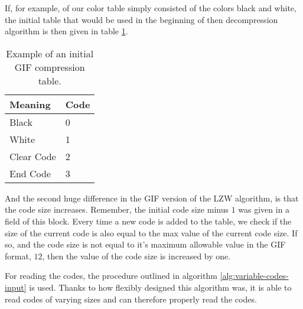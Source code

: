 If, for example, of our color table simply consisted of the colors
black and white, the initial table that would be used in the beginning
of then decompression algorithm is then given in table
\ref{tab:example-gif-color-table}.

\begin{table}
  \centering
  \begin{tabular}{ll}
    \toprule
    Meaning & Code \\
    \midrule
    Black & 0 \\
    White & 1 \\
    Clear Code & 2 \\
    End Code & 3 \\
    \bottomrule
  \end{tabular}
  \caption{Example of an initial GIF compression table.}
  \label{tab:example-gif-color-table}
\end{table}

And the second huge difference in the GIF version of the LZW
algorithm, is that the code size increases. Remember, the initial code
size minus $1$ was given in a field of this block. Every time a new
code is added to the table, we check if the size of the current code
is also equal to the max value of the current code size. If so, and
the code size is not equal to it's maximum allowable value in the GIF
format, $12$, then the value of the code size is increased by one.

For reading the codes, the procedure outlined in algorithm
\ref{alg:variable-codes-input} is used. Thanks to how flexibly
designed this algorithm was, it is able to read codes of varying
sizes and can therefore properly read the codes.

